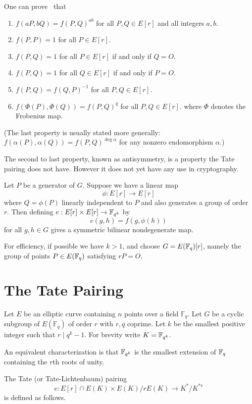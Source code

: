 One can prove~\cite{silverman} that
\begin{enumerate}
\item
$f(a P, b Q) = f(P,Q)^{a b}$ for all $P, Q \in E[r]$ and all integers $a, b$.
\item
$f(P,P) = 1$ for all $P \in E[r]$.
\item
$f(P,Q) = 1$ for all $P \in E[r]$ if and only if $Q = O$.
\item
$f(P,Q) = 1$ for all $Q \in E[r]$ if and only if $P = O$.
\item
$f(P,Q) = f(Q,P)^{-1}$ for all $P,Q \in E[r]$.
\item
$f(\Phi(P),\Phi(Q)) = f(P,Q)^{q}$ for all $P,Q \in E[r]$.
where $\Phi$ denotes the Frobenius map.
\end{enumerate}

(The last property is usually stated more generally:
$f(\alpha(P),\alpha(Q)) = f(P,Q)^{\deg \alpha}$ for any nonzero
endomorphism $\alpha$.)

The second to last property, known as antisymmetry, is a property the
Tate pairing does not have. However it does not yet have
any use in cryptography.

Let $P$ be a generator of $G$. Suppose
we have a linear map
\[ \phi : E[r] \rightarrow E[r] \]
where $Q = \phi(P)$ linearly independent to $P$ and also generates
a group of order $r$.
Then defining $e:E[r]\times E[r]\rightarrow \mathbb{F}_{q^k}$ by
\[ e(g,h) = f(g,\phi(h)) \]
for all $g, h \in G$
gives a symmetric bilinear nondegenerate map.

For efficiency, if possible we have $k > 1$, and choose
$G = E(\mathbb{F}_q)[r]$, namely the
group of points $P \in E(\mathbb{F}_q)$ satisfying $r P = O$.

\section {The Tate Pairing }

Let $E$ be an elliptic curve containing $n$ points over a field $\mathbb{F}_q$.
Let $G$ be a cyclic subgroup of $E(\mathbb{F}_q)$ of order $r$ with $r, q$
coprime. Let $k$ be the smallest positive integer such that $r \mid q^k - 1$.
For brevity write $K = \mathbb{F}_{q^k}$.

An equivalent characterization is that
$\mathbb{F}_{q^k}$ is the smallest extension of $\mathbb{F}_q$ containing the $r$th roots of unity.

The Tate (or Tate-Lichtenbaum) pairing
\[
e : E[r] \cap E(K) \times
E(K) / r E(K) \rightarrow
K^* / K^{*r}
\]
is defined as follows.

